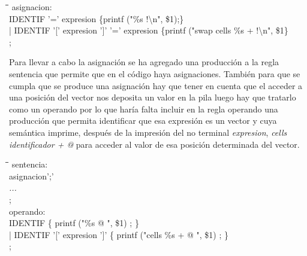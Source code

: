 \documentclass[11pt,spanish]{article}
\begin{document}
		\begin{tcolorbox}
		\begin{tabbing}
			\hspace*{1cm}\=\hspace*{1cm}\= \hspace*{8cm}\=\kill
			asignacion:\\
				\>IDENTIF '=' expresion\> \>											\{printf ("\%s !\textbackslash n", \$1);\}\\
				\>| IDENTIF '[' expresion ']' '=' expresion\> \>						\{printf ("swap cells \%s + !\textbackslash n", \$1\}\\
	
			;
		\end{tabbing}
		\end{tcolorbox}
		Para llevar a cabo la asignación se ha agregado una producción a la regla {\ttfamily sentencia} que permite que en el código haya asignaciones. También para que se cumpla que se produce una asignación hay que tener en cuenta que el acceder a una posición del vector nos deposita un valor en la pila luego hay que tratarlo como un operando por lo que haría falta incluir en la regla {\ttfamily operando} una producción que permita identificar que esa expresión es un vector y cuya semántica imprime, después de la impresión del no terminal \textit{expresion}, \textit{cells identificador + @} para acceder al valor de esa posición determinada del vector.
		
		\begin{tcolorbox}
		\begin{tabbing}
			\hspace*{1cm}\=\hspace*{1cm}\= \hspace*{4cm}\=\kill
			sentencia:\\
				\>asignacion';'\\
				\>\textit{...}\\
			;\\
			operando:\\	  
				\>IDENTIF\> \>	  		\{ printf ("\%s @ ", \$1) ; \}\\
				\>| IDENTIF '[' expresion ']'\> \> \{ printf ("cells \%s + @ ", \$1) ; \}\\
			;
		\end{tabbing}
		\end{tcolorbox}
\end{document}
